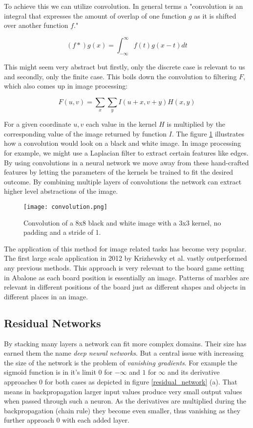 To achieve this we can utilize convolution. In general terms a "convolution is an integral that expresses the amount of overlap of one function $g$ as it is shifted over another function $f$." \cite{weisstein_convolution_nodate}

$$
    (f * )g(x) = \int_{-\infty}^{\infty} f(t)g(x - t) dt
$$

This might seem very abstract but firstly, only the discrete case is relevant to us and secondly, only the finite case. This boils down the convolution to filtering $F$, which also comes up in image processing:

$$
    F(u, v) = \sum_{x} \sum_{y} I(u+x, v+y)H(x, y)
$$

For a given coordinate $u,v$ each value in the kernel $H$ is multiplied by the  corresponding value of the image returned by function $I$. The figure \ref{convolution} illustrates how a convolution would look on a black and white image. In image processing for example, we might use a Laplacian filter to extract certain features like edges. By using convolutions in a neural network we move away from these hand-crafted features by letting the parameters of the kernels be trained to fit the desired outcome. By combining multiple layers of convolutions the network can extract higher level abstractions of the image. \cite{ilin_abstraction_2017}

\begin{figure}
    \centering
    \texttt{[image: convolution.png]}
    \caption{Convolution of a 8x8 black and white image with a 3x3 kernel, no padding and a stride of 1. \cite{bruasdal_deep_2020}}
    \label{convolution}
\end{figure}


The application of this method for image related tasks has become very popular. The first large scale application in 2012 by Krizhevsky et al. \cite{krizhevsky_imagenet_2017} vastly outperformed any previous methods. This approach is very relevant to the board game setting in Abalone as each board position is essentially an image. Patterns of marbles are relevant in different positions of the board just as different shapes and objects in different places in an image.

\subsection{Residual Networks}
By stacking many layers a network can fit more complex domains. Their size has earned them the name \textit{deep neural networks}. But a central issue with increasing the size of the network is the problem of \textit{vanishing gradients}. For example the sigmoid function is in it's limit $0$ for $-\infty$ and $1$ for $\infty$ and its derivative approaches $0$ for both cases as depicted in figure \ref{residual_network} (a). That means in backpropagation larger input values produce very small output values when passed through such a neuron. As the derivatives are multiplied during the backpropagation (chain rule) they become even smaller, thus vanishing as they further approach $0$ with each added layer.

